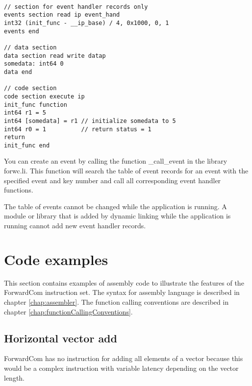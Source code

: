\documentclass[forwardcom.tex]{subfiles}
\begin{document}
\begin{example}
\label{exampleEventHandler}
\end{example} %
\begin{lstlisting}[frame=single]

// section for event handler records only
events section read ip event_hand
int32 (init_func - __ip_base) / 4, 0x1000, 0, 1
events end

// data section
data section read write datap
somedata: int64 0
data end

// code section
code section execute ip
init_func function
int64 r1 = 5
int64 [somedata] = r1 // initialize somedata to 5
int64 r0 = 1          // return status = 1
return
init_func end

\end{lstlisting}
\vspace{4mm}

You can create an event by calling the function \_call\_event in the library forwc.li.
This function will search the table of event records for an event with the specified 
event and key number and call all corresponding event handler functions.
\vspace{2mm}

The table of events cannot be changed while the application is running. 
A module or library that is added by dynamic linking while the application is running
cannot add new event handler records.
\vspace{2mm}

\section{Code examples}\label{chap:codeExamples}

This section contains examples of assembly code to illustrate the features of the ForwardCom instruction set.
The syntax for assembly language is described in chapter \ref{chap:assembler}.
The function calling conventions are described in chapter \ref{chap:functionCallingConventions}.
\vspace{2mm}


\subsection{Horizontal vector add} \label{horizontalVectorAdd}
ForwardCom has no instruction for adding all elements of a vector because this would be a complex instruction with variable latency depending on the vector length.
\vspace{2mm}
\end{document}
